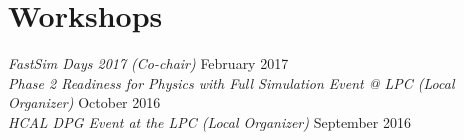 \section{Workshops}
{\sl FastSim Days 2017 (Co-chair)} \hfill February 2017\\
{\sl Phase 2 Readiness for Physics with Full Simulation Event @ LPC (Local Organizer)} \hfill October 2016\\
{\sl HCAL DPG Event at the LPC (Local Organizer)} \hfill September 2016\ifdefined\longestflag%
\else\\
\fi
